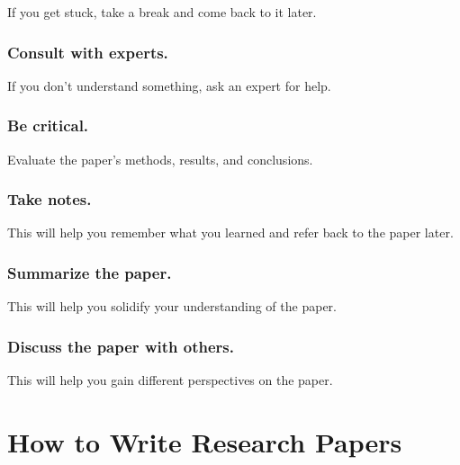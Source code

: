 \documentclass[
  b5paper]{book}
\begin{document}
If you get stuck, take a break and come back to it later.

\hypertarget{consult-with-experts.}{%
\subsubsection*{Consult with experts.}\label{consult-with-experts.}}

If you don't understand something, ask an expert for help.

\hypertarget{be-critical.}{%
\subsubsection*{Be critical.}\label{be-critical.}}

Evaluate the paper's methods, results, and conclusions.

\hypertarget{take-notes.}{%
\subsubsection*{Take notes.}\label{take-notes.}}

This will help you remember what you learned and refer back to the paper later.

\hypertarget{summarize-the-paper.}{%
\subsubsection*{Summarize the paper.}\label{summarize-the-paper.}}

This will help you solidify your understanding of the paper.

\hypertarget{discuss-the-paper-with-others.}{%
\subsubsection*{Discuss the paper with others.}\label{discuss-the-paper-with-others.}}

This will help you gain different perspectives on the paper.

\hypertarget{how-to-write-research-papers}{%
\section{How to Write Research Papers}\label{how-to-write-research-papers}}
\end{document}
